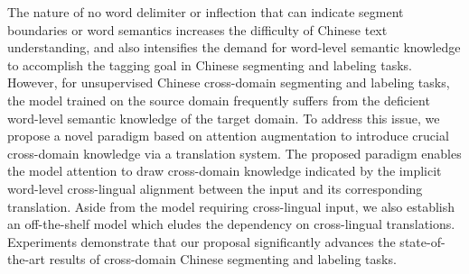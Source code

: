 The nature of no word delimiter or inflection that can indicate segment boundaries or word semantics increases the difficulty of Chinese text understanding, and also intensifies the demand for word-level semantic knowledge to accomplish the tagging goal in Chinese segmenting and labeling tasks. However, for unsupervised Chinese cross-domain segmenting and labeling tasks, the model trained on the source domain frequently suffers from the deficient word-level semantic knowledge of the target domain. To address this issue, we propose a novel paradigm based on attention augmentation to introduce crucial cross-domain knowledge via a translation system. The proposed paradigm enables the model attention to draw cross-domain knowledge indicated by the implicit word-level cross-lingual alignment between the input and its corresponding translation. Aside from the model requiring cross-lingual input, we also establish an off-the-shelf model which eludes the dependency on cross-lingual translations. Experiments demonstrate that our proposal significantly advances the state-of-the-art results of cross-domain Chinese segmenting and labeling tasks.
